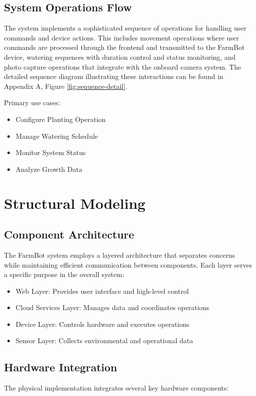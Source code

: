 \subsection{System Operations Flow}
The system implements a sophisticated sequence of operations for handling user commands and device actions. This includes movement operations where user commands are processed through the frontend and transmitted to the FarmBot device, watering sequences with duration control and status monitoring, and photo capture operations that integrate with the onboard camera system. The detailed sequence diagram illustrating these interactions can be found in Appendix A, Figure \ref{fig:sequence-detail}.

Primary use cases:
\begin{itemize}
    \item Configure Planting Operation
    \item Manage Watering Schedule
    \item Monitor System Status
    \item Analyze Growth Data
\end{itemize}

\section{Structural Modeling}

\subsection{Component Architecture}
The FarmBot system employs a layered architecture that separates concerns while maintaining efficient communication between components. Each layer serves a specific purpose in the overall system:

\begin{itemize}
    \item Web Layer: Provides user interface and high-level control
    \item Cloud Services Layer: Manages data and coordinates operations
    \item Device Layer: Controls hardware and executes operations
    \item Sensor Layer: Collects environmental and operational data
\end{itemize}

\subsection{Hardware Integration}
The physical implementation integrates several key hardware components:

